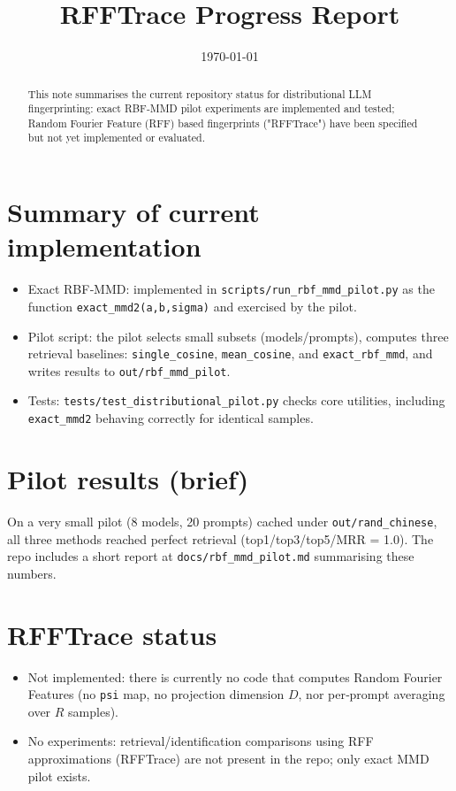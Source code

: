 \documentclass[11pt,a4paper]{article}
\title{RFFTrace Progress Report}
\author{}
\date{\today}
\begin{document}
\maketitle

\begin{abstract}
This note summarises the current repository status for distributional
LLM fingerprinting: exact RBF‑MMD pilot experiments are implemented and
tested; Random Fourier Feature (RFF) based fingerprints ("RFFTrace")
have been specified but not yet implemented or evaluated.
\end{abstract}

\section{Summary of current implementation}
\begin{itemize}
  \item Exact RBF‑MMD: implemented in \texttt{scripts/run\_rbf\_mmd\_pilot.py} as
    the function \texttt{exact\_mmd2(a,b,sigma)} and exercised by the pilot.
  \item Pilot script: the pilot selects small subsets (models/prompts),
    computes three retrieval baselines: \texttt{single\_cosine}, \texttt{mean\_cosine},
    and \texttt{exact\_rbf\_mmd}, and writes results to \texttt{out/rbf\_mmd\_pilot}.
  \item Tests: \texttt{tests/test\_distributional\_pilot.py} checks core utilities,
    including \texttt{exact\_mmd2} behaving correctly for identical samples.
\end{itemize}

\section{Pilot results (brief)}
On a very small pilot (8 models, 20 prompts) cached under \texttt{out/rand\_chinese},
all three methods reached perfect retrieval (top1/top3/top5/MRR = 1.0). The repo
includes a short report at \texttt{docs/rbf\_mmd\_pilot.md} summarising these numbers.

\section{RFFTrace status}
\begin{itemize}
  \item Not implemented: there is currently no code that computes Random Fourier
    Features (no \texttt{psi} map, no projection dimension \(D\), nor per‑prompt averaging over \(R\) samples).
  \item No experiments: retrieval/identification comparisons using RFF approximations
    (RFFTrace) are not present in the repo; only exact MMD pilot exists.
\end{itemize}
\end{document}
